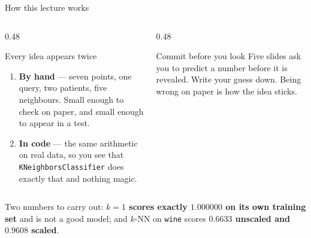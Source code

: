 \documentclass[aspectratio=169]{beamer}
\begin{document}
\begin{frame}[shrink=6]{How this lecture works}
  \begin{columns}[T]
    \begin{column}{0.48\textwidth}
      \begin{block}{Every idea appears twice}
        \begin{enumerate}
          \item \textbf{By hand} --- seven points, one query, two patients,
            five neighbours. Small enough to check on paper, and small enough
            to appear in a test.
          \item \textbf{In code} --- the same arithmetic on real data, so you
            see that \texttt{KNeighborsClassifier} does exactly that and
            nothing magic.
        \end{enumerate}
      \end{block}
    \end{column}
    \begin{column}{0.48\textwidth}
      \begin{alertblock}{Commit before you look}
        Five slides ask you to predict a number before it is revealed. Write
        your guess down. Being wrong on paper is how the idea sticks.
      \end{alertblock}
    \end{column}
  \end{columns}
  \vspace{0.4em}
  \begin{center}
    \small Two numbers to carry out: \textbf{$k=1$ scores exactly $1.000000$
    on its own training set} and is not a good model; and $k$-NN on
    \texttt{wine} scores \textbf{$0.6633$ unscaled and $0.9608$ scaled}.
  \end{center}
\end{frame}
\end{document}
